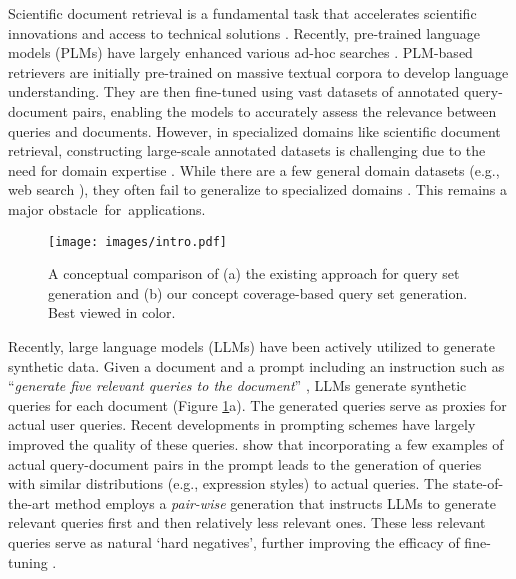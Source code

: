 Scientific document retrieval is a fundamental task that accelerates scientific innovations and access to technical solutions \cite{taxoindex}.
Recently, pre-trained language models (PLMs) have largely enhanced various ad-hoc searches \cite{CTR, DPR}. 
PLM-based retrievers are initially pre-trained on massive textual corpora to develop language understanding.
They are then fine-tuned using vast datasets of annotated query-document pairs, enabling the models to accurately assess the relevance between queries and documents.
However, in specialized domains like scientific document retrieval, constructing large-scale annotated datasets is challenging due to the need for domain expertise \cite{li2023sailer, ToTER, inpars}.
While there are a few general domain datasets (e.g., web search \cite{msmarco_data, NQ_data}), they often fail to generalize to specialized domains \cite{BEIR, inpars}.
This remains a major obstacle~for~applications.


\begin{figure}[t]
    \centering    
    \hspace{-0.2cm}
    \texttt{[image: images/intro.pdf]}
    \caption{A conceptual comparison of (a) the existing approach for query set generation and (b) our concept coverage-based query set generation. Best viewed in color.}
    \label{fig:intro}
\end{figure}

Recently, large language models (LLMs) \cite{GPT3, FLAN, Tzero, Llama} have been actively utilized to generate synthetic data.
Given a document and a prompt including an instruction such as ``\textit{generate five relevant queries to the document}'' \cite{synthetic_apple_VA, dai2022promptagator}, LLMs generate synthetic queries for each document (Figure \ref{fig:intro}a).
The generated queries serve as proxies for actual user queries.
Recent developments in prompting schemes have largely improved the quality of these queries. 
\cite{inpars, dai2022promptagator} show that incorporating a few examples of actual query-document pairs in the prompt leads to the generation of queries with similar distributions (e.g., expression styles) to actual queries.
The state-of-the-art method \cite{pairwise_qgen} employs a \textit{pair-wise} generation that instructs LLMs to generate relevant queries first and then relatively less relevant ones. 
These less relevant queries serve as natural `hard negatives', further improving the efficacy of fine-tuning \cite{pairwise_qgen}.




